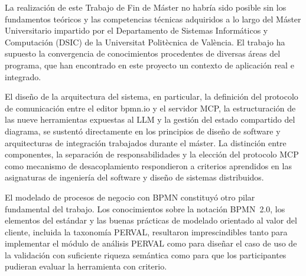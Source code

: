 La realización de este Trabajo de Fin de Máster no habría sido posible sin los fundamentos teóricos y las competencias técnicas adquiridos a lo largo del Máster Universitario impartido por el Departamento de Sistemas Informáticos y Computación (DSIC) de la Universitat Politècnica de València. El trabajo ha supuesto la convergencia de conocimientos procedentes de diversas áreas del programa, que han encontrado en este proyecto un contexto de aplicación real e integrado.

El diseño de la arquitectura del sistema, en particular, la definición del protocolo de comunicación entre el editor bpmn.io y el servidor MCP, la estructuración de las nueve herramientas expuestas al LLM y la gestión del estado compartido del diagrama, se sustentó directamente en los principios de diseño de software y arquitecturas de integración trabajados durante el máster. La distinción entre componentes, la separación de responsabilidades y la elección del protocolo MCP como mecanismo de desacoplamiento respondieron a criterios aprendidos en las asignaturas de ingeniería del software y diseño de sistemas distribuidos.

El modelado de procesos de negocio con BPMN constituyó otro pilar fundamental del trabajo. Los conocimientos sobre la notación BPMN~2.0, los elementos del estándar y las buenas prácticas de modelado orientado al valor del cliente, incluida la taxonomía PERVAL, resultaron imprescindibles tanto para implementar el módulo de análisis PERVAL como para diseñar el caso de uso de la validación con suficiente riqueza semántica como para que los participantes pudieran evaluar la herramienta con criterio.

